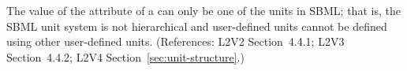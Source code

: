 The value of the  attribute of a \Unit can only be
one of the  units in SBML; that is, the SBML unit
system is not hierarchical and user-defined units cannot be defined using
other user-defined units.  (References: L2V2 Section~4.4.1;
L2V3 Section~4.4.2; L2V4 Section~\ref{sec:unit-structure}.)
